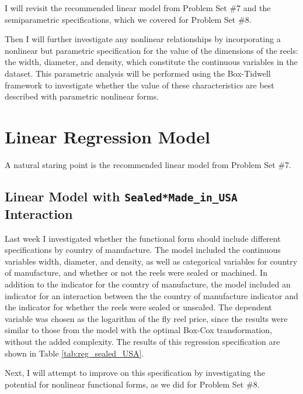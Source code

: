 I will revisit the recommended linear model
from Problem Set \#7
and the semiparametric specifications, 
which we covered for Problem Set \#8. 



Then I will further investigate any nonlinear relationships
by incorporating a nonlinear but parametric specification
for the value of the dimensions of the reels:
the width, diameter, and density, 
which constitute the continuous variables in the dataset.
This parametric analysis will be performed
using the Box-Tidwell framework
to investigate whether the value of these characteristics
are best described with parametric nonlinear forms. 


\clearpage
\section{Linear Regression Model}

A natural staring point is the recommended linear model
from Problem Set \#7. 

\subsection{Linear Model with \texttt{Sealed*Made\_in\_USA} Interaction}

Last week I investigated whether 
the functional form should include different specifications by
country of manufacture.
% 
The model included the continuous variables 
width, diameter, and density, 
as well as categorical variables for 
country of manufacture, 
and whether or not the reels were sealed or machined. 
% 
In addition to the indicator for the country of manufacture, the model included an indicator for an interaction between
the the country of manufacture indicator and the indicator for whether the reels were sealed or unsealed. 
% 
The dependent variable was chosen as 
the logarithm of the fly reel price, 
since the results were similar to those from the model 
with the optimal Box-Cox transformation, 
without the added complexity. 
% 
The results of this regression specification are shown in 
Table \ref{tab:reg_sealed_USA}. 
% 

% 
Next, I will attempt to improve on this specification
by investigating the potential for nonlinear functional forms, 
as we did for Problem Set \#8. 







